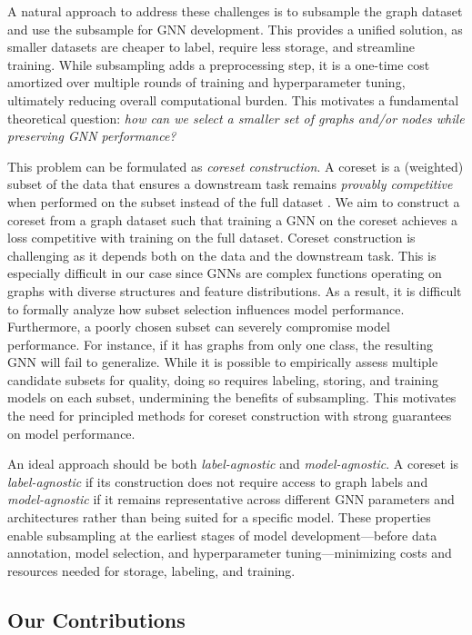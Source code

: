 A natural approach to address these challenges is to subsample the graph dataset and use the subsample for GNN development. This provides a unified solution, as smaller datasets are cheaper to label, require less storage, and streamline training.  While subsampling adds a preprocessing step, it is a one-time cost amortized over multiple rounds of training and hyperparameter tuning, ultimately reducing overall computational burden. This motivates a fundamental theoretical question: \emph{how can we select a smaller set of graphs and/or nodes while preserving GNN performance?} 

This problem can be formulated as \emph{coreset construction}. A coreset is a (weighted) subset of the data that ensures a downstream task remains \emph{provably competitive} when performed on the subset instead of the full dataset \citep{bachem_practical_2017}. We aim to construct a coreset from a graph dataset such that training a GNN on the coreset achieves a loss competitive with training on the full dataset. Coreset construction is challenging as it depends both on the data and the downstream task. This is especially difficult in our case since GNNs are complex functions operating on graphs with diverse structures and feature distributions. As a result, it is difficult to formally analyze how subset selection influences model performance. Furthermore, a poorly chosen subset can severely compromise model performance. For instance, if it has graphs from only one class, the resulting GNN will fail to generalize. While it is possible to empirically assess multiple candidate subsets for quality, doing so requires labeling, storing, and training models on each subset, undermining the benefits of subsampling. This motivates the need for principled methods for coreset construction with strong guarantees on model performance.

An ideal approach should be both \emph{label-agnostic} and \emph{model-agnostic}. A coreset is \emph{label-agnostic} if its construction does not require access to graph labels and \emph{model-agnostic} if it remains representative across different GNN parameters and architectures rather than being suited for a specific model. These properties enable subsampling at the earliest stages of model development—before data annotation, model selection, and hyperparameter tuning—minimizing costs and resources needed for storage, labeling, and training.




\subsection{Our Contributions}

